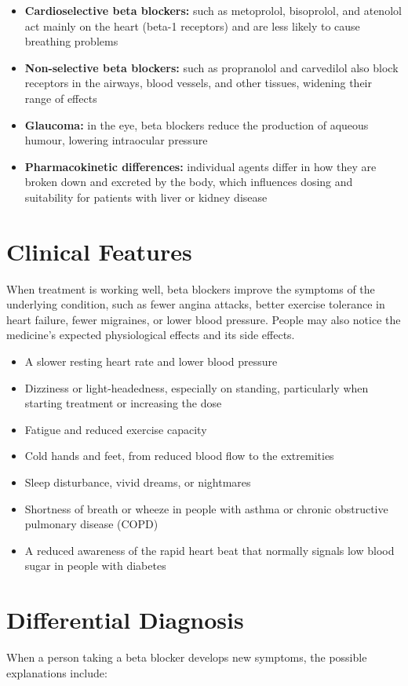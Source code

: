 \begin{itemize}
    \item \textbf{Cardioselective beta blockers:} such as metoprolol, bisoprolol, and atenolol act mainly on the heart (beta-1 receptors) and are less likely to cause breathing problems
    \item \textbf{Non-selective beta blockers:} such as propranolol and carvedilol also block receptors in the airways, blood vessels, and other tissues, widening their range of effects
    \item \textbf{Glaucoma:} in the eye, beta blockers reduce the production of aqueous humour, lowering intraocular pressure
    \item \textbf{Pharmacokinetic differences:} individual agents differ in how they are broken down and excreted by the body, which influences dosing and suitability for patients with liver or kidney disease
\end{itemize}

\section*{Clinical Features}
When treatment is working well, beta blockers improve the symptoms of the underlying condition, such as fewer angina attacks, better exercise tolerance in heart failure, fewer migraines, or lower blood pressure. People may also notice the medicine's expected physiological effects and its side effects.

\begin{itemize}
    \item A slower resting heart rate and lower blood pressure
    \item Dizziness or light-headedness, especially on standing, particularly when starting treatment or increasing the dose
    \item Fatigue and reduced exercise capacity
    \item Cold hands and feet, from reduced blood flow to the extremities
    \item Sleep disturbance, vivid dreams, or nightmares
    \item Shortness of breath or wheeze in people with asthma or chronic obstructive pulmonary disease (COPD)
    \item A reduced awareness of the rapid heart beat that normally signals low blood sugar in people with diabetes
\end{itemize}

\section*{Differential Diagnosis}
When a person taking a beta blocker develops new symptoms, the possible explanations include:

